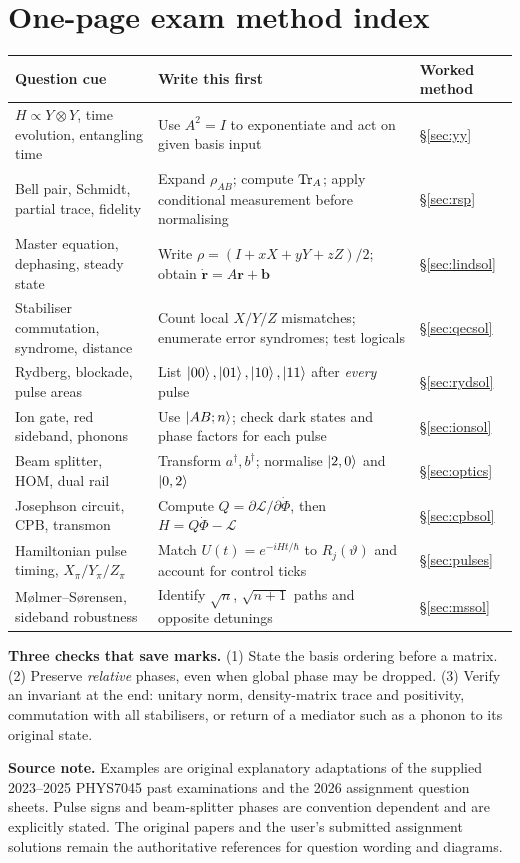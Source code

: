 \section{One-page exam method index}\label{sec:index}
\small
\renewcommand{\arraystretch}{1.15}
\begin{tabularx}{\linewidth}{@{}p{37mm}X p{27mm}@{}}\toprule
Question cue&Write this first&Worked method\\\midrule
$H\propto Y\otimes Y$, time evolution, entangling time&Use $A^2=I$ to exponentiate and act on given basis input&\S\ref{sec:yy}\\
Bell pair, Schmidt, partial trace, fidelity&Expand $\rho_{AB}$; compute $\operatorname{Tr}_A$; apply conditional measurement before normalising&\S\ref{sec:rsp}\\
Master equation, dephasing, steady state&Write $\rho=(I+xX+yY+zZ)/2$; obtain $\dot{\bm r}=A\bm r+\bm b$&\S\ref{sec:lindsol}\\
Stabiliser commutation, syndrome, distance&Count local $X/Y/Z$ mismatches; enumerate error syndromes; test logicals&\S\ref{sec:qecsol}\\
Rydberg, blockade, pulse areas&List $\left\lvert 00\right\rangle,\left\lvert 01\right\rangle,\left\lvert 10\right\rangle,\left\lvert 11\right\rangle$ after \emph{every} pulse&\S\ref{sec:rydsol}\\
Ion gate, red sideband, phonons&Use $\left\lvert AB;n\right\rangle$; check dark states and phase factors for each pulse&\S\ref{sec:ionsol}\\
Beam splitter, HOM, dual rail&Transform $a^\dagger,b^\dagger$; normalise $\left\lvert 2,0\right\rangle$ and $\left\lvert 0,2\right\rangle$&\S\ref{sec:optics}\\
Josephson circuit, CPB, transmon&Compute $Q=\partial\mathcal L/\partial\dot\Phi$, then $H=Q\dot\Phi-\mathcal L$&\S\ref{sec:cpbsol}\\
Hamiltonian pulse timing, $X_\pi/Y_\pi/Z_\pi$&Match $U(t)=e^{-iHt/\hbar}$ to $R_j(\vartheta)$ and account for control ticks&\S\ref{sec:pulses}\\
M\o lmer--S\o rensen, sideband robustness&Identify $\sqrt n$, $\sqrt{n+1}$ paths and opposite detunings&\S\ref{sec:mssol}\\\bottomrule
\end{tabularx}
\normalsize
\begin{bigidea}
\textbf{Three checks that save marks.} (1) State the basis ordering before a matrix. (2) Preserve \emph{relative} phases, even when global phase may be dropped. (3) Verify an invariant at the end: unitary norm, density-matrix trace and positivity, commutation with all stabilisers, or return of a mediator such as a phonon to its original state.
\end{bigidea}
\begin{flushleft}
{\footnotesize \textbf{Source note.} Examples are original explanatory adaptations of the supplied 2023--2025 PHYS7045 past examinations and the 2026 assignment question sheets. Pulse signs and beam-splitter phases are convention dependent and are explicitly stated. The original papers and the user's submitted assignment solutions remain the authoritative references for question wording and diagrams.}
\end{flushleft}